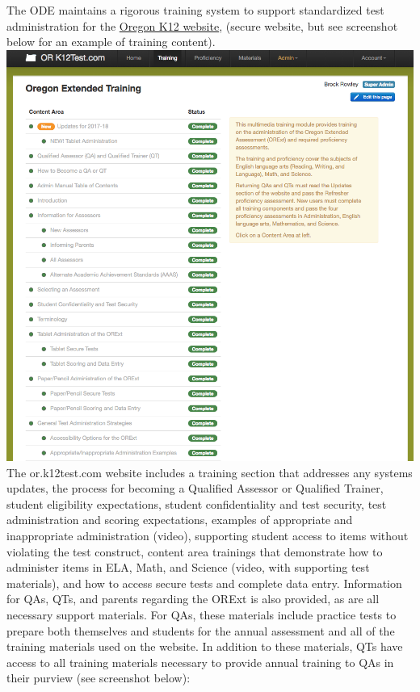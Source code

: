 \documentclass[]{article}
\begin{document}
The ODE maintains a rigorous training system to support standardized
test administration for the \color{link}
\href{https://or.k12test.com}{Oregon K12 website}\color{black}, (secure
website, but see screenshot below for an example of training content).
\FloatBarrier
\includegraphics{Figures/TrainingSite/TrainingSite.png} \clearpage
The or.k12test.com website includes a training section that addresses
any systems updates, the process for becoming a Qualified Assessor or
Qualified Trainer, student eligibility expectations, student
confidentiality and test security, test administration and scoring
expectations, examples of appropriate and inappropriate administration
(video), supporting student access to items without violating the test
construct, content area trainings that demonstrate how to administer
items in ELA, Math, and Science (video, with supporting test materials),
and how to access secure tests and complete data entry. Information for
QAs, QTs, and parents regarding the ORExt is also provided, as are all
necessary support materials. For QAs, these materials include practice
tests to prepare both themselves and students for the annual assessment
and all of the training materials used on the website. In addition to
these materials, QTs have access to all training materials necessary to
provide annual training to QAs in their purview (see screenshot below):
\end{document}
